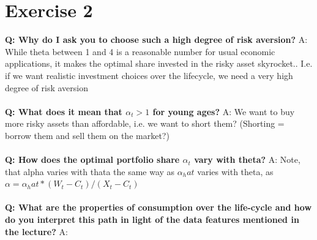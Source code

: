 \documentclass[12pt,a4paper]{article}
\begin{document}
\section*{Exercise 2}

\textbf{Q: Why do I ask you to choose such a high degree of risk aversion?}
A: While theta between 1 and 4 is a reasonable number for usual economic applications, it makes the optimal share invested in the risky asset skyrocket.. I.e. if we want realistic investment choices over the lifecycle, we need a very high degree of risk aversion \\ \\

\textbf{Q: What does it mean that $\alpha_t > 1$ for young ages? }
A: We want to buy more risky assets than affordable, i.e. we want to short them? (Shorting = borrow them and sell them on the market?) \\ \\

\textbf{Q: How does the optimal portfolio share $\alpha_t$ vary with theta? }
A: Note, that alpha varies with thata the same way as $\alpha_hat$ varies with theta, as $\alpha = \alpha_hat * (W_t - C_t)/ (X_t - C_t)$ \\ \\

\textbf{Q: What are the properties of consumption over the life-cycle and how do you interpret this path in light of the data features mentioned in the lecture?}
A: \\ \\
\end{document}
